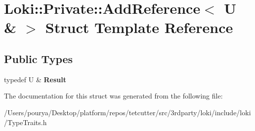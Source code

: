 \hypertarget{structLoki_1_1Private_1_1AddReference_3_01U_01_6_01_4}{}\section{Loki\+:\+:Private\+:\+:Add\+Reference$<$ U \& $>$ Struct Template Reference}
\label{structLoki_1_1Private_1_1AddReference_3_01U_01_6_01_4}
\subsection*{Public Types}
\begin{DoxyCompactItemize}
\item 
\hypertarget{structLoki_1_1Private_1_1AddReference_3_01U_01_6_01_4_a91df501b73ca92fad9d201bda996f9cc}{}typedef U \& {\bfseries Result}\label{structLoki_1_1Private_1_1AddReference_3_01U_01_6_01_4_a91df501b73ca92fad9d201bda996f9cc}

\end{DoxyCompactItemize}


The documentation for this struct was generated from the following file\+:\begin{DoxyCompactItemize}
\item 
/\+Users/pourya/\+Desktop/platform/repos/tetcutter/src/3rdparty/loki/include/loki/Type\+Traits.\+h\end{DoxyCompactItemize}
